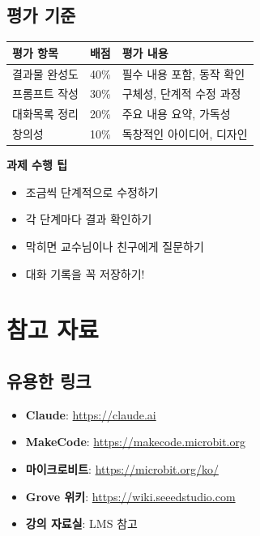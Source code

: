 \documentclass[11pt, a4paper]{article}
\begin{document}
\subsection{평가 기준}

\begin{table}[H]
\centering
\begin{tabularx}{\textwidth}{|l|c|X|}
\hline
\rowcolor{lightgray}
\textbf{평가 항목} & \textbf{배점} & \textbf{평가 내용} \\
\hline
결과물 완성도 & 40\% & 필수 내용 포함, 동작 확인 \\
\hline
프롬프트 작성 & 30\% & 구체성, 단계적 수정 과정 \\
\hline
대화목록 정리 & 20\% & 주요 내용 요약, 가독성 \\
\hline
창의성 & 10\% & 독창적인 아이디어, 디자인 \\
\hline
\end{tabularx}
\end{table}

\begin{keypoint}
\textbf{과제 수행 팁}
\begin{itemize}
  \item 조금씩 단계적으로 수정하기
  \item 각 단계마다 결과 확인하기
  \item 막히면 교수님이나 친구에게 질문하기
  \item 대화 기록을 꼭 저장하기!
\end{itemize}
\end{keypoint}

\newpage

\section{참고 자료}

\subsection{유용한 링크}

\begin{itemize}
  \item \textbf{Claude}: \url{https://claude.ai}
  \item \textbf{MakeCode}: \url{https://makecode.microbit.org}
  \item \textbf{마이크로비트}: \url{https://microbit.org/ko/}
  \item \textbf{Grove 위키}: \url{https://wiki.seeedstudio.com}
  \item \textbf{강의 자료실}: LMS 참고
\end{itemize}
\end{document}
